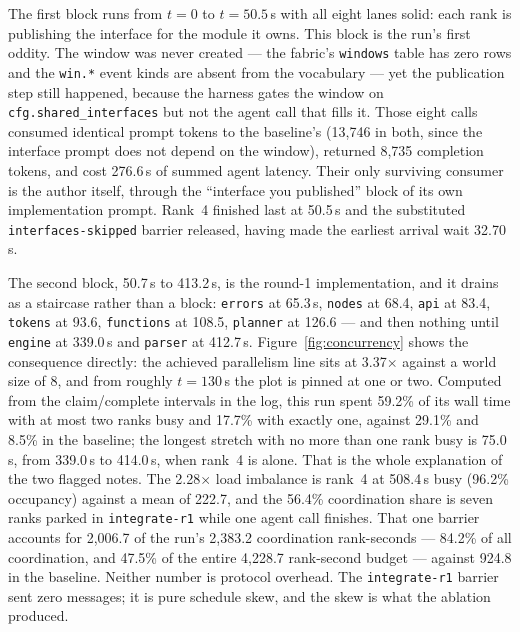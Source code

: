 \documentclass[11pt]{article}
\begin{document}
The first block runs from $t=0$ to $t=50.5$\,s with all eight lanes solid: each rank is
publishing the interface for the module it owns. This block is the run's first oddity. The
window was never created --- the fabric's \texttt{windows} table has zero rows and the
\texttt{win.*} event kinds are absent from the vocabulary --- yet the publication step still
happened, because the harness gates the window on \texttt{cfg.shared\_interfaces} but not the
agent call that fills it. Those eight calls consumed identical prompt tokens to the baseline's
(13{,}746 in both, since the interface prompt does not depend on the window), returned 8{,}735
completion tokens, and cost 276.6\,s of summed agent latency. Their only surviving consumer is
the author itself, through the ``interface you published'' block of its own implementation
prompt. Rank~4 finished last at 50.5\,s and the substituted \texttt{interfaces-skipped}
barrier released, having made the earliest arrival wait 32.70\,s.

The second block, 50.7\,s to 413.2\,s, is the round-1 implementation, and it drains as a
staircase rather than a block: \texttt{errors} at 65.3\,s, \texttt{nodes} at 68.4,
\texttt{api} at 83.4, \texttt{tokens} at 93.6, \texttt{functions} at 108.5, \texttt{planner}
at 126.6 --- and then nothing until \texttt{engine} at 339.0\,s and \texttt{parser} at
412.7\,s. Figure~\ref{fig:concurrency} shows the consequence directly: the achieved
parallelism line sits at 3.37$\times$ against a world size of 8, and from roughly $t=130$\,s
the plot is pinned at one or two. Computed from the claim/complete intervals in the log, this
run spent 59.2\% of its wall time with at most two ranks busy and 17.7\% with exactly one,
against 29.1\% and 8.5\% in the baseline; the longest stretch with no more than one rank busy
is 75.0\,s, from 339.0\,s to 414.0\,s, when rank~4 is alone. That is the whole explanation of
the two flagged notes. The 2.28$\times$ load imbalance is rank~4 at 508.4\,s busy (96.2\%
occupancy) against a mean of 222.7, and the 56.4\% coordination share is seven ranks parked in
\texttt{integrate-r1} while one agent call finishes. That one barrier accounts for 2{,}006.7 of
the run's 2{,}383.2 coordination rank-seconds --- 84.2\% of all coordination, and 47.5\% of the
entire 4{,}228.7 rank-second budget --- against 924.8 in the baseline. Neither number is protocol
overhead. The \texttt{integrate-r1} barrier sent zero messages; it is pure schedule skew, and
the skew is what the ablation produced.
\end{document}
